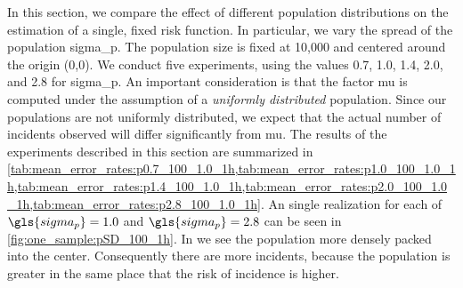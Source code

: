 In this section, we compare the effect of different population distributions on the estimation of a single, fixed risk function.
In particular, we vary the \gls{spread} of the population \gls{sigma_p}.
The population size is fixed at 10,000 and centered around the origin (0,0).
We conduct five experiments, using the values 0.7, 1.0, 1.4, 2.0, and 2.8 for \gls{sigma_p}.
An important consideration is that the \gls{factor} \gls{mu} is computed under the assumption of a \textit{uniformly distributed} population.
Since our populations are not uniformly distributed, we expect that the actual number of incidents observed will differ significantly from \gls{mu}.
The results of the experiments described in this section are summarized in \cref{tab:mean_error_rates:p0.7_100_1.0_1h,tab:mean_error_rates:p1.0_100_1.0_1h,tab:mean_error_rates:p1.4_100_1.0_1h,tab:mean_error_rates:p2.0_100_1.0_1h,tab:mean_error_rates:p2.8_100_1.0_1h}.
An single realization for each of $\gls{sigma_p} = 1.0$ and $\gls{sigma_p} = 2.8$ can be seen in \cref{fig:one_sample:pSD_100_1h}.
In  we see the population more densely packed into the center.
Consequently there are more incidents,
because the population is greater in the same place that the risk of incidence is higher.

